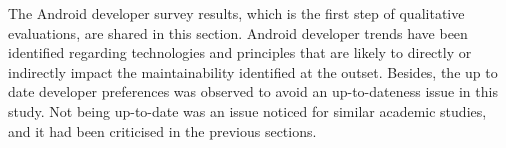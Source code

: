 The Android developer survey results, which is the first step of qualitative evaluations, are shared in this section. Android developer trends have been identified regarding technologies and principles that are likely to directly or indirectly impact the maintainability identified at the outset. Besides, the up to date developer preferences was observed to avoid an up-to-dateness issue in this study. Not being up-to-date was an issue noticed for similar academic studies, and it had been criticised in the previous sections.